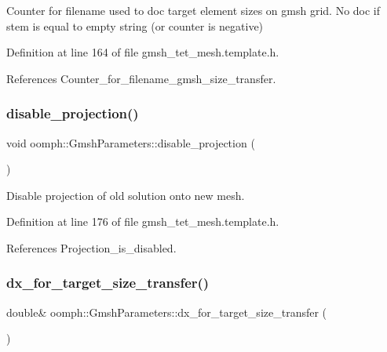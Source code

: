 Counter for filename used to doc target element sizes on gmsh grid. No doc if stem is equal to empty string (or counter is negative) 



Definition at line 164 of file gmsh\+\_\+tet\+\_\+mesh.\+template.\+h.



References Counter\+\_\+for\+\_\+filename\+\_\+gmsh\+\_\+size\+\_\+transfer.

\mbox{\label{classoomph_1_1GmshParameters_ad9c1ebc0ae01551b7899364a1cf25f19}} 
\subsubsection{\texorpdfstring{disable\+\_\+projection()}{disable\_projection()}}
{\footnotesize\ttfamily void oomph\+::\+Gmsh\+Parameters\+::disable\+\_\+projection (\begin{DoxyParamCaption}{ }\end{DoxyParamCaption})\hspace{0.3cm}{\ttfamily [inline]}}



Disable projection of old solution onto new mesh. 



Definition at line 176 of file gmsh\+\_\+tet\+\_\+mesh.\+template.\+h.



References Projection\+\_\+is\+\_\+disabled.

\mbox{\label{classoomph_1_1GmshParameters_ae5db3c2aca27f73ee53e32178255130d}} 
\subsubsection{\texorpdfstring{dx\+\_\+for\+\_\+target\+\_\+size\+\_\+transfer()}{dx\_for\_target\_size\_transfer()}}
{\footnotesize\ttfamily double\& oomph\+::\+Gmsh\+Parameters\+::dx\+\_\+for\+\_\+target\+\_\+size\+\_\+transfer (\begin{DoxyParamCaption}{ }\end{DoxyParamCaption})\hspace{0.3cm}{\ttfamily [inline]}}



